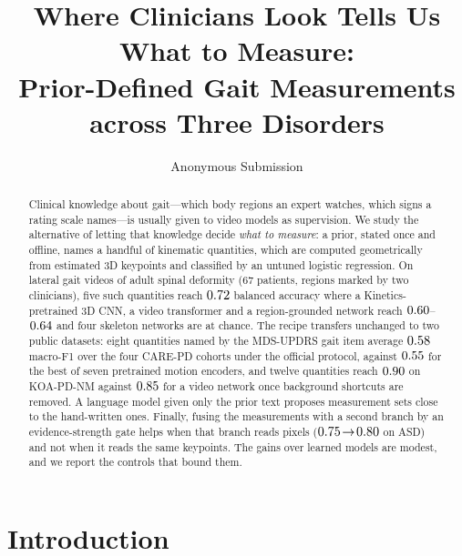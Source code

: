 \documentclass[runningheads]{llncs}
\newcommand{\todo}[1]{\textcolor{red}{[TODO: #1]}}
\newcommand{\asd}{ASD}
\begin{document}
\title{Where Clinicians Look Tells Us What to Measure:\\
Prior-Defined Gait Measurements across Three Disorders}

\author{Anonymous Submission}
\institute{Paper ID \todo{ID}}

\maketitle

\begin{abstract}
Clinical knowledge about gait---which body regions an expert watches, which signs a rating
scale names---is usually given to video models as supervision. We study the alternative of
letting that knowledge decide \emph{what to measure}: a prior, stated once and offline, names
a handful of kinematic quantities, which are computed geometrically from estimated 3D
keypoints and classified by an untuned logistic regression. On lateral gait videos of adult
spinal deformity (67 patients, regions marked by two clinicians), five such quantities reach
$0.72$ balanced accuracy where a Kinetics-pretrained 3D CNN, a video transformer and
a region-grounded network reach $0.60$--$0.64$ and four skeleton networks are at
chance. The recipe transfers unchanged to two public datasets: eight quantities named by the
MDS-UPDRS gait item average $0.58$ macro-F1 over the four CARE-PD cohorts under the
official protocol, against $0.55$ for the best of seven pretrained motion encoders,
and twelve quantities reach $0.90$ on KOA-PD-NM against $0.85$ for a video
network once background shortcuts are removed. A language model given only the prior text
proposes measurement sets close to the hand-written ones. Finally, fusing the measurements
with a second branch by an evidence-strength gate helps when that branch reads pixels
($0.75\!\to\!0.80$ on \asd) and not when it reads the same keypoints. The
gains over learned models are modest, and we report the controls that bound them.
\end{abstract}

\section{Introduction}
\end{document}
